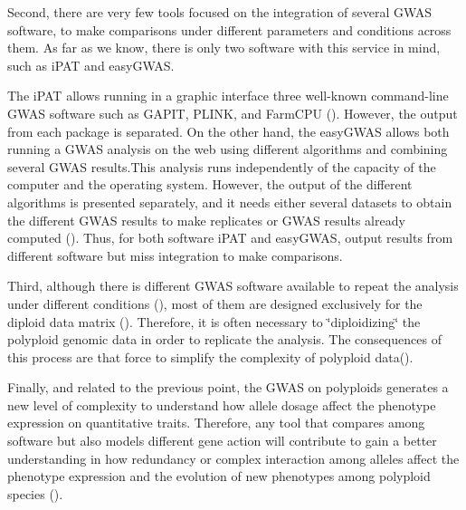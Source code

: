 \documentclass{article}
\begin{document}
Second, there are very few tools focused on the integration of several GWAS software, to make comparisons under different parameters and conditions across them. As far as we know, there is only two software with this service in mind, such as iPAT and easyGWAS.

The iPAT allows running in a graphic interface three well-known command-line GWAS software such as GAPIT, PLINK, and FarmCPU (\cite{Zhang2018}). However, the output from each package is separated.  On the other hand, the easyGWAS allows both running a GWAS analysis on the web using different algorithms and combining several GWAS results.This analysis runs independently of the capacity of the computer and the operating system. However, the output of the different algorithms is presented separately, and it needs either several datasets to obtain the different GWAS results to make replicates or GWAS results already computed (\cite{Grimm2017}). Thus, for both software iPAT and easyGWAS, output results from different software but miss integration to make comparisons.

Third, although there is different GWAS software available to repeat the analysis under different conditions (\cite{Gumpinger2018}), most of them are designed exclusively for the diploid data matrix (\cite{Bourke2018}). Therefore, it is often necessary to \char`\"{}diploidizing\char`\"{} the polyploid genomic data in order to replicate the analysis. The consequences of this process are that force to simplify the complexity of polyploid data(\cite{Ferrao2018}). 

Finally, and related to the previous point, the GWAS on polyploids generates a new level of complexity to understand how allele dosage affect the phenotype expression on quantitative traits. Therefore, any tool that compares among software but also models different gene action  will contribute to gain a better understanding in how redundancy or complex interaction among alleles affect the phenotype expression and the evolution of new phenotypes among polyploid species (\cite{Bourke2018, Rosyara2016, Ferrao2018}). 
\end{document}
